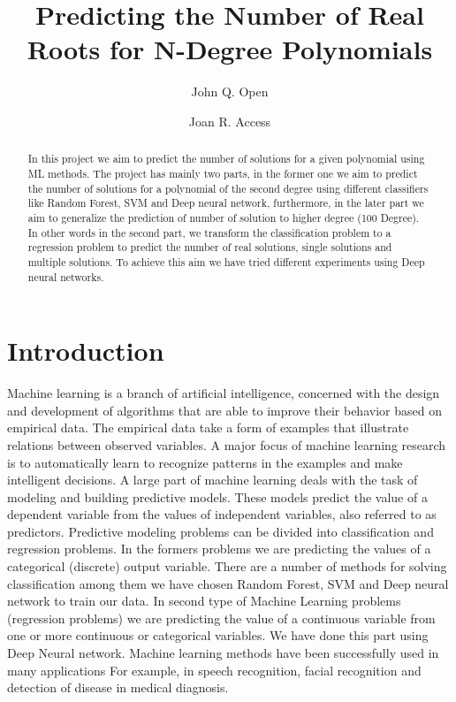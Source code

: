 \documentclass[a4paper,UKenglish]{lipics-v2016}
\title{Predicting the Number of Real Roots for N-Degree Polynomials}
\author[1]{John Q. Open}
\author[2]{Joan R. Access}
\affil[1]{Dummy University Computing Laboratory, Address/City, Country\\
  \texttt{open@dummyuniversity.org}}
\affil[2]{Department of Informatics, Dummy College, Address/City, Country\\
  \texttt{access@dummycollege.org}}
\begin{document}
\maketitle

\begin{abstract}
    In this project we aim to predict the number of solutions for a given polynomial using ML methods.
    The project has mainly two parts, in the former one we aim to predict the number of solutions
    for a polynomial of the second degree using different classifiers like Random Forest, SVM and Deep neural network,
    furthermore, in the later part we aim to generalize the prediction of number of solution to higher degree (100 Degree).
    In other words in the second part, we transform the classification problem to a regression problem
    to predict the number of real solutions, single solutions and multiple solutions.
    To achieve this aim we have tried different experiments using Deep neural networks.
 \end{abstract}


 \section{Introduction\label{section1}}


 Machine learning is a branch of artificial intelligence, concerned with the design and development of algorithms that are able to improve their behavior based on empirical data. The empirical data take a form of examples that illustrate relations between observed variables. A major focus of machine learning research is to automatically learn to recognize patterns in the examples and make intelligent decisions.
 A large part of machine learning deals with the task of modeling and building predictive models. These models predict the value of a dependent variable from the values of independent variables, also referred to as predictors. Predictive modeling problems can be divided into classification and regression problems. In the formers problems we are predicting the values of a categorical (discrete) output variable. There are a number of methods for solving classification  among them we have chosen  Random Forest, SVM and Deep neural network to train our data.   In second type of Machine Learning problems (regression problems) we are predicting the value of a continuous variable from one or more continuous or categorical variables. We have done this part using Deep Neural network. Machine learning methods have been successfully used in many applications For example, in speech recognition, facial recognition and detection of disease in medical diagnosis.
\end{document}
